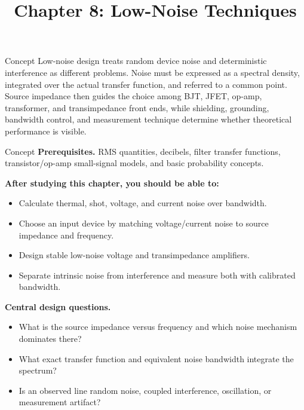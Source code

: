 \documentclass[10pt,letterpaper]{article}
\title{Chapter 8: Low-Noise Techniques}
\author{}
\date{}
\begin{document}
\maketitle

\begin{CornellOverviewBox}{Concept}
Low-noise design treats random device noise and deterministic interference as different problems. Noise must be expressed as a spectral density, integrated over the actual transfer function, and referred to a common point. Source impedance then guides the choice among BJT, JFET, op-amp, transformer, and transimpedance front ends, while shielding, grounding, bandwidth control, and measurement technique determine whether theoretical performance is visible.
\end{CornellOverviewBox}
\begin{CornellOverviewBox}{Concept}
\textbf{Prerequisites.} RMS quantities, decibels, filter transfer functions, transistor/op-amp small-signal models, and basic probability concepts.

\textbf{After studying this chapter, you should be able to:}
\begin{itemize}
  \item Calculate thermal, shot, voltage, and current noise over bandwidth.
  \item Choose an input device by matching voltage/current noise to source impedance and frequency.
  \item Design stable low-noise voltage and transimpedance amplifiers.
  \item Separate intrinsic noise from interference and measure both with calibrated bandwidth.
\end{itemize}\textbf{Central design questions.}
\begin{itemize}
  \item What is the source impedance versus frequency and which noise mechanism dominates there?
  \item What exact transfer function and equivalent noise bandwidth integrate the spectrum?
  \item Is an observed line random noise, coupled interference, oscillation, or measurement artifact?
\end{itemize}\end{CornellOverviewBox}
\end{document}
